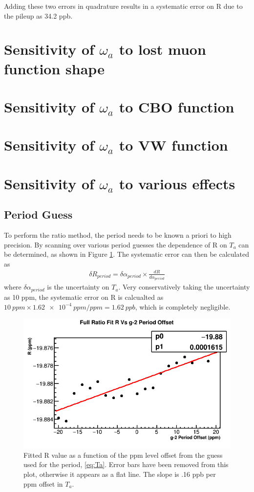 Adding these two errors in quadrature results in a systematic error on R due to the pileup as 34.2 ppb.



\section{Sensitivity of \texorpdfstring{$\omega_{a}$}{} to lost muon function shape}

\section{Sensitivity of \texorpdfstring{$\omega_{a}$}{} to CBO function}

\section{Sensitivity of \texorpdfstring{$\omega_{a}$}{} to VW function}

\section{Sensitivity of \texorpdfstring{$\omega_{a}$}{} to various effects}

\subsection{\gmtwo Period Guess}

To perform the ratio method, the \gmtwo period needs to be known a priori to high precision. By scanning over various \gmtwo period guesses the dependence of R on $T_{a}$ can be determined, as shown in Figure \ref{fig:gm2PeriodGuess}. The systematic error can then be calculated as 
	\begin{align}
		\delta R_{period} = \delta\alpha_{period} \times \frac{dR}{d\alpha_{period}}
	\end{align}
where $\delta\alpha_{period}$ is the uncertainty on $T_{a}$. Very conservatively taking the uncertainty as 10 ppm, the systematic error on R is calcualted as $\SI{10}{ppm} \times \SI{1.62e-4}{ppm/ppm} = \SI{1.62}{ppb}$, which is completely negligible.

\begin{figure}[H]
	\centering
	\includegraphics[width=.6\textwidth]{RatioCBO_R_Vs_gm2PeriodGuess_Canv}
    \caption[gm2PeriodGuess]{Fitted R value as a function of the ppm level offset from the guess used for the \gmtwo period, \ref{eq:Ta}. Error bars have been removed from this plot, otherwise it appears as a flat line. The slope is .16 ppb per ppm offset in $T_{a}$.}
    \label{fig:gm2PeriodGuess}
\end{figure}


